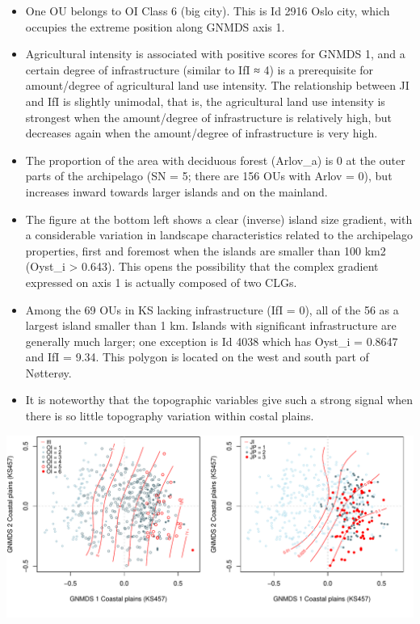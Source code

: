\documentclass[]{article}
\providecommand{\tightlist}{%
  \setlength{\itemsep}{0pt}\setlength{\parskip}{0pt}}
\begin{document}
\begin{itemize}
\tightlist
\item
  One OU belongs to OI Class 6 (big city). This is Id 2916 Oslo city,
  which occupies the extreme position along GNMDS axis 1.
\item
  Agricultural intensity is associated with positive scores for GNMDS 1,
  and a certain degree of infrastructure (similar to IfI ≈ 4) is a
  prerequisite for amount/degree of agricultural land use intensity. The
  relationship between JI and IfI is slightly unimodal, that is, the
  agricultural land use intensity is strongest when the amount/degree of
  infrastructure is relatively high, but decreases again when the
  amount/degree of infrastructure is very high.
\item
  The proportion of the area with deciduous forest (Arlov\_a) is 0 at
  the outer parts of the archipelago (SN = 5; there are 156 OUs with
  Arlov = 0), but increases inward towards larger islands and on the
  mainland.
\item
  The figure at the bottom left shows a clear (inverse) island size
  gradient, with a considerable variation in landscape characteristics
  related to the archipelago properties, first and foremost when the
  islands are smaller than 100 km2 (Oyst\_i \textgreater{} 0.643). This
  opens the possibility that the complex gradient expressed on axis 1 is
  actually composed of two CLGs.
\item
  Among the 69 OUs in KS lacking infrastructure (IfI = 0), all of the 56
  as a largest island smaller than 1 km. Islands with significant
  infrastructure are generally much larger; one exception is Id 4038
  which has Oyst\_i = 0.8647 and IfI = 9.34. This polygon is located on
  the west and south part of Nøtterøy.
\item
  It is noteworthy that the topographic variables give such a strong
  signal when there is so little topography variation within costal
  plains.
\end{itemize}

\includegraphics{Landscape_analysis_example_4_files/figure-latex/unnamed-chunk-11-1.pdf}
\end{document}
